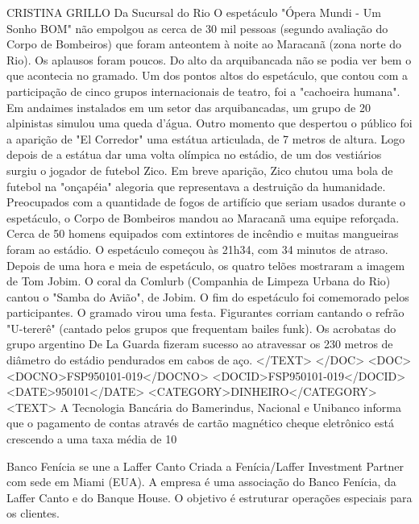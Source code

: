 CRISTINA GRILLO 
Da Sucursal do Rio 
O espetáculo "Ópera Mundi - Um Sonho BOM" não empolgou as cerca de 30 mil pessoas (segundo avaliação do Corpo de Bombeiros) que foram anteontem à noite ao Maracanã (zona norte do Rio).
Os aplausos foram poucos. Do alto da arquibancada não se podia ver bem o que acontecia no gramado. Um dos pontos altos do espetáculo, que contou com a participação de cinco grupos internacionais de teatro, foi a "cachoeira humana". Em andaimes instalados em um setor das arquibancadas, um grupo de 20 alpinistas simulou uma queda d'água.
Outro momento que despertou o público foi a aparição de "El Corredor" uma estátua articulada, de 7 metros de altura. Logo depois de a estátua dar uma volta olímpica no estádio, de um dos vestiários surgiu o jogador de futebol Zico.
Em breve aparição, Zico chutou uma bola de futebol na "onçapéia" alegoria que representava a destruição da humanidade.
Preocupados com a quantidade de fogos de artifício que seriam usados durante o espetáculo, o Corpo de Bombeiros mandou ao Maracanã uma equipe reforçada. Cerca de 50 homens equipados com extintores de incêndio e muitas mangueiras foram ao estádio.
O espetáculo começou às 21h34, com 34 minutos de atraso. Depois de uma hora e meia de espetáculo, os quatro telões mostraram a imagem de Tom Jobim. O coral da Comlurb (Companhia de Limpeza Urbana do Rio) cantou o "Samba do Avião", de Jobim.
O fim do espetáculo foi comemorado pelos participantes. O gramado virou uma festa. Figurantes corriam cantando o refrão "U-tererê" (cantado pelos grupos que frequentam bailes funk).
Os acrobatas do grupo argentino De La Guarda fizeram sucesso ao atravessar os 230 metros de diâmetro do estádio pendurados em cabos de aço.
</TEXT>
</DOC>
<DOC>
<DOCNO>FSP950101-019</DOCNO>
<DOCID>FSP950101-019</DOCID>
<DATE>950101</DATE>
<CATEGORY>DINHEIRO</CATEGORY>
<TEXT>
A Tecnologia Bancária do Bamerindus, Nacional e Unibanco informa que o pagamento de contas através de cartão magnético cheque eletrônico está crescendo a uma taxa média de 10%

Banco Fenícia se une a Laffer Canto 
Criada a Fenícia/Laffer Investment Partner com sede em Miami (EUA). A empresa é uma associação do Banco Fenícia, da Laffer Canto e do Banque House. O objetivo é estruturar operações especiais para os clientes. 

